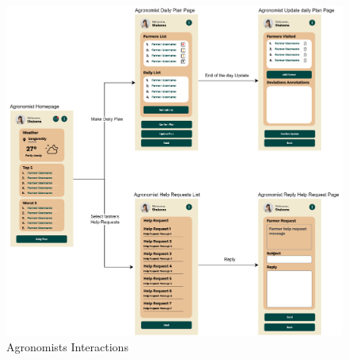 \documentclass[table, 12pt]{article}
\begin{document}
\begin{center}
    \begin{figure}[H]
        \vspace{-50px}
        \includegraphics[scale=0.8, center]{assets/MockUp/AgroInteractions.png}
        \caption{Agronomists Interactions}
        \label{fig: agroMockup}
    \end{figure}
\end{center}
\end{document}
